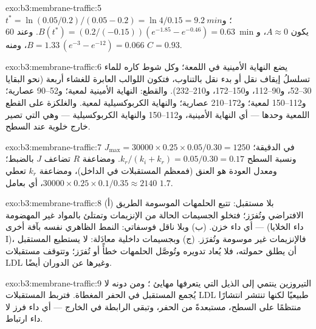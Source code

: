 \begin{solution}{exo:b3:membrane-traffic:5}
$t^{*} = \ln(0.05/0.2)/(0.05 - 0.2) = \ln 4/0.15 = \qty{9.2}{min}$؛
و$B(t^{*}) = (0.2/(-0.15))(e^{-1.85} - e^{-0.46}) = 0.63$. وعند \qty{60}{min}
يكون $A \approx 0$، و$B = 1.33\,(e^{-3} - e^{-12}) = 0.066$، ومنه $C = 0.93$.
\end{solution}

\begin{solution}{exo:b3:membrane-traffic:6}
 يضع النهاية الأمينية في اللمعة؛ وكل
شوط كاره للماء تسلسلُ إيقاف نقل أو بدء نقل بالتناوب،
فتكون اللوالب العابرة للغشاء أربعة (نحو البقايا 30--52،
و90--112، و150--172، و210--232). والقطع: النهاية الأمينية لمعية؛
و52--90 عصارية؛ و112--150 لمعية؛ و172--210 عصارية؛ والنهاية
الكربوكسيلية لمعية. والغلكزة على القطع اللمعية وحدها --- أي
النهاية الأمينية، و112--150 والنهاية الكربوكسيلية --- وهي التي تصير
خارج خلوية عند السطح.
\end{solution}

\begin{solution}{exo:b3:membrane-traffic:7}
$J_{\max} = \num{30000}\times 0.25\times 0.05/0.30 = 1250$ في الدقيقة؛
ونسبة السطح $k_{r}/(k_{i} + k_{r}) = 0.05/0.30 = 0.17$. ومضاعفة $R$
تضاعف $J$ بالضبط؛ ومعدل العودة هو العنق (فمعظم المستقبلات
في الداخل)، ومضاعفة $k_{r}$ تعطي $\num{30000}\times 0.25
\times 0.1/0.35 \approx 2140$، أي بعامل $1.7$.
\end{solution}

\begin{solution}{exo:b3:membrane-traffic:8}
(أ) بلا مستقبل: تتبع الحلمهات الموسومة الطريق الافتراضي
وتُفرَز؛ فتخلو الجسيمات الحالة من الإنزيمات وتمتلئ بالمواد
غير المهضومة --- أي داء خزن. (ب) وبلا ناقل فوسفاتي: النمط
الظاهري نفسه بآفة أخرى (داء الخلايا I)، فالإنزيمات
غير موسومة وتُفرَز. (ج) وبجسيمات داخلية معادَلة: لا يستطيع المستقبل
أن يطلق حمولته، فلا يُعاد تدويره وتُوصَّل الحلمهات
خطأً أو تُفرَز؛ وتتوقف مستقبلات LDL وغيرها عن الدوران أيضًا.
\end{solution}

\begin{solution}{exo:b3:membrane-traffic:9}
التيروزين ينتمي إلى  الذيل التي يتعرفها مهايئ
؛ ومن دونه لا يُجمع المستقبل في الحفر المغطاة.
فتربط المستقبلات LDL طبيعيًا لكنها تنتشر انتشارًا منتظمًا على
السطح، مستبعدةً من الحفر، وتبقى الرابطة في الخارج --- أي
داء فرز لا داء ارتباط.
\end{solution}

